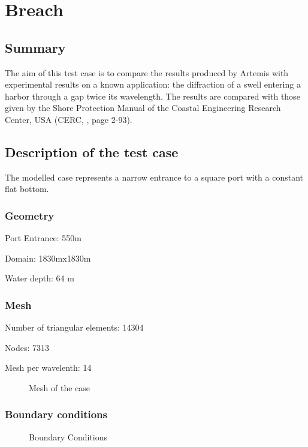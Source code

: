 \chapter{Breach}
\section{Summary}
The aim of this test case is to compare the results produced by Artemis with
experimental results on a known application: the diffraction of a swell
entering a harbor through a gap twice its wavelength. The results are
compared with those given by the Shore Protection Manual of the Coastal
Engineering Research Center, USA (CERC, \cite{CERC84}, page 2-93).
\section{Description of the test case}
The modelled case represents a narrow entrance to a square port with a constant flat bottom.
\subsection{Geometry}
Port Entrance: 550m

Domain: 1830mx1830m

Water depth: 64 m

\subsection{Mesh}
Number of triangular elements: 14304

Nodes: 7313

Mesh per wavelenth: 14

\begin{figure}[h]
\begin{center}
\end{center}
\caption{Mesh of the case}
\label{fig:breach_Mesh}
\end{figure}

\subsection{Boundary conditions}
\begin{figure}[h]
\begin{center}
\end{center}
\caption{Boundary Conditions}
\label{fig:breach_bc}
\end{figure}

